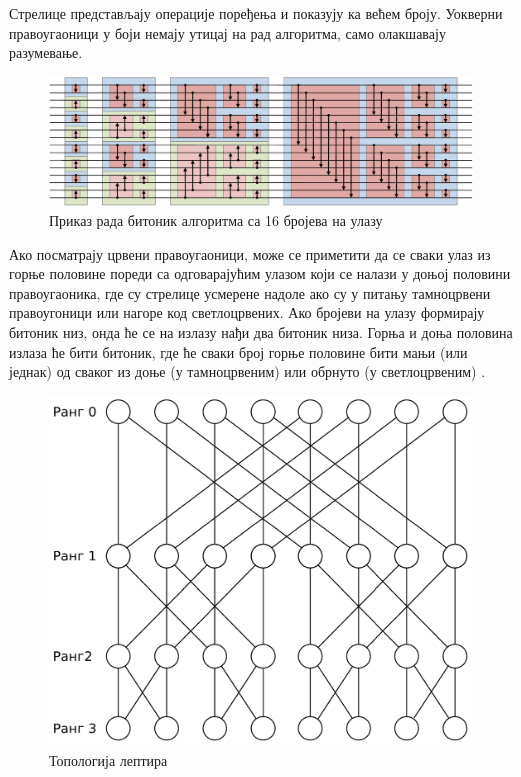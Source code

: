 \documentclass[12pt, a4paper]{article}
\theoremstyle{definition}
\begin{document}
Стрелице представљају операције поређења и показују ка већем броју. Уокверни правоугаоници у боји немају утицај на рад алгоритма, само олакшавају разумевање.
\begin{figure}[H]
  \centering
      \includegraphics[scale=0.7]{slike/BitonicSort1.pdf}
  \caption{Приказ рада битоник алгоритма са 16 бројева на улазу}
  \label{fig:bitonicSortWiki}
\end{figure}
Ако посматрају црвени правоугаоници, може се приметити да се сваки улаз из горње половине пореди са одговарајућим улазом који се налази у доњој половини правоугаоника, где су стрелице усмерене надоле ако су у питању тамноцрвени правоугоници или нагоре код светлоцрвених.
%
Ако бројеви на улазу формирају битоник низ, онда ће се на излазу нађи два битоник низа. Горња и доња половина излаза ће бити битоник, где ће сваки број горње половине бити мањи (или једнак) од сваког из доње (у тамноцрвеним) или обрнуто (у светлоцрвеним) \cite{wiki_bitonic}.
%
\begin{figure}[H]
  \centering
      \includegraphics[scale=0.16]{slike/leptir}
  \caption{Топологија лептира}
  \label{fig:leptir}
\end{figure}
\end{document}
